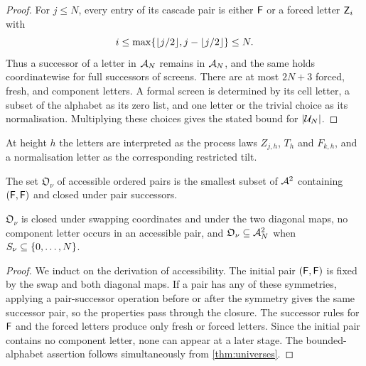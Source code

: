 \begin{proof}
\leanok
For $j\leq N$, every entry of its cascade pair is either $\mathsf{F}$ or a forced letter $\mathsf{Z}_i$ with
\[
 i\leq\max\{\lfloor j/2 \rfloor,j-\lfloor j/2 \rfloor\}\leq N.
\]
Thus a successor of a letter in $\mathcal{A}_N$ remains in $\mathcal{A}_N$, and the same holds coordinatewise
for full successors of screens. There are at most $2N+3$ forced, fresh, and component letters.
A formal screen is determined by its cell letter, a subset of the alphabet as its zero list, and
one letter or the trivial choice as its normalisation. Multiplying these choices gives the stated
bound for $\lvert \mathcal{U}_N \rvert$.
\end{proof}

\begin{definition}
\label{def:interp}
\leanok
{}
At height $h$ the letters are interpreted as the process laws $Z_{j,h}$, $T_h$ and $F_{k,h}$,
and a normalisation letter as the corresponding restricted tilt.
\end{definition}

\begin{definition}
\label{def:ordacc}
\leanok
{}
The set $\mathfrak O_\nu$ of accessible ordered pairs is the smallest subset of $\mathcal{A}^2$
containing $(\mathsf{F},\mathsf{F})$ and closed under pair successors.
\end{definition}

\begin{lemma}
\label{thm:ordacc-inv}
\leanok
{}
$\mathfrak O_\nu$ is closed under swapping coordinates and under the two diagonal maps, no
component letter occurs in an accessible pair, and $\mathfrak O_\nu\subseteq\mathcal{A}_N^2$ when
$S_\nu\subseteq\{0,\dots,N\}$.
\end{lemma}

\begin{proof}
\leanok
{}
We induct on the derivation of accessibility. The initial pair $(\mathsf{F},\mathsf{F})$ is fixed by the swap
and both diagonal maps. If a pair has any of these symmetries, applying a pair-successor operation
before or after the symmetry gives the same successor pair, so the properties pass through the
closure. The successor rules for $\mathsf{F}$ and the forced letters produce only fresh or forced
letters. Since the initial pair contains no component letter, none can appear at a later stage.
The bounded-alphabet assertion follows simultaneously from \cref{thm:universes}.
\end{proof}

